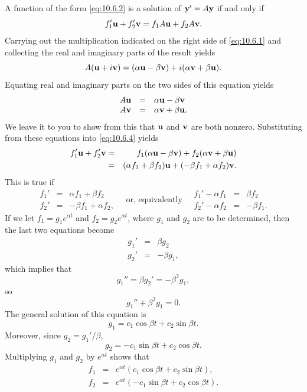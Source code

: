 \documentclass{ximera}
\begin{document}
\proof
A function of the form \eqref{eq:10.6.2} is a solution of ${\bf y}'=A{\bf
y}$ if and only if
\begin{equation} \label{eq:10.6.4}
f_1'{\bf u}+f_2'{\bf
v}=f_1A{\bf u}+f_2A{\bf v}.
\end{equation}
Carrying out the multiplication indicated on the  right side
of \eqref{eq:10.6.1} and collecting the  real and imaginary parts of the
result yields
$$
A({\bf u}+i{\bf v})=(\alpha{\bf u}-\beta{\bf v})+i(\alpha{\bf v}+\beta{\bf
u}).
$$
Equating real and imaginary parts on the two sides of this equation yields
$$
\begin{array}{rcl}
A{\bf u}&=&\alpha{\bf u}-\beta{\bf v}\\
A{\bf v}&=&\alpha{\bf v}+\beta{\bf u}.
\end{array}
$$
We leave it to you %
to show from this that
${\bf u}$ and
${\bf v}$ are both nonzero.
Substituting from these equations into \eqref{eq:10.6.4} yields
\begin{eqnarray*}
f_1'{\bf u}+f_2'{\bf v}
&=&f_1(\alpha{\bf u}-\beta{\bf v})+f_2(\alpha{\bf v}+\beta{\bf u})\\
&=&(\alpha f_1+\beta f_2){\bf u}+(-\beta f_1+\alpha f_2){\bf v}.
\end{eqnarray*}
This is true if
$$
\begin{array}{rcr}
f_1'&=&\alpha f_1+\beta f_2\\
f_2'&=&-\beta f_1+\alpha f_2,
\end{array}
\quad\mbox{or, equivalently}\quad
\begin{array}{rcr}
f_1'-\alpha f_1&=&\beta f_2\\
f_2'-\alpha f_2&=&-\beta f_1.
\end{array}
$$
If we let $f_1=g_1e^{\alpha t}$ and $f_2=g_2e^{\alpha t}$, where
$g_1$ and $g_2$ are to be determined, then the last two equations
become
$$
\begin{array}{rcr}
g_1'&=&\beta g_2\\
g_2'&=&-\beta g_1,
\end{array}
$$
which implies that
$$
g_1''=\beta g_2'=-\beta^2 g_1,
$$
so
$$
g_1''+\beta^2 g_1=0.
$$
The general solution of this equation is
$$
g_1=c_1\cos\beta t+c_2\sin\beta t.
$$
Moreover, since $g_2=g_1'/\beta$,
$$
g_2=-c_1\sin\beta t+c_2\cos\beta t.
$$
Multiplying  $g_1$  and $g_2$  by $e^{\alpha t}$ shows that
\begin{eqnarray*}
f_1&=&e^{\alpha t}(c_1\cos\beta t+c_2\sin\beta t ),\\
f_2&=&e^{\alpha t}(-c_1\sin\beta t+c_2\cos\beta t).
\end{eqnarray*}
\end{document}

